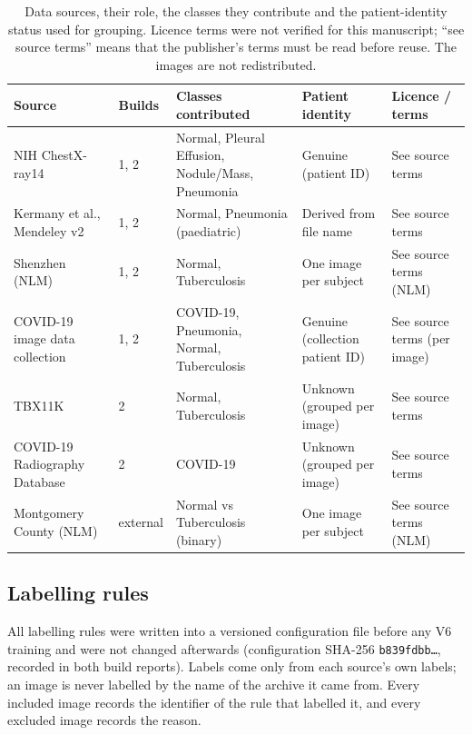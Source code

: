 \begin{table}[t]
\centering
\caption{Data sources, their role, the classes they contribute and the patient-identity status used for grouping. Licence terms were not verified for this manuscript; ``see source terms'' means that the publisher's terms must be read before reuse. The images are not redistributed.}
\label{tab:sources}
\small
\begin{tabular}{@{}p{3.0cm}p{1.5cm}p{3.6cm}p{2.4cm}p{3.2cm}@{}}
\toprule
Source & Builds & Classes contributed & Patient identity & Licence / terms \\
\midrule
NIH ChestX-ray14~\cite{wang2017chestxray8} & 1, 2 & Normal, Pleural Effusion, Nodule/Mass, Pneumonia & Genuine (patient ID) & See source terms \\
Kermany et al., Mendeley v2~\cite{kermany2018identifying} & 1, 2 & Normal, Pneumonia (paediatric) & Derived from file name & See source terms \\
Shenzhen (NLM)~\cite{jaeger2014two,candemir2014lung} & 1, 2 & Normal, Tuberculosis & One image per subject & See source terms (NLM) \\
COVID-19 image data collection~\cite{cohen2020covid} & 1, 2 & COVID-19, Pneumonia, Normal, Tuberculosis & Genuine (collection patient ID) & See source terms (per image) \\
TBX11K~\cite{liu2020rethinking} & 2 & Normal, Tuberculosis & Unknown (grouped per image) & See source terms \\
COVID-19 Radiography Database~\cite{chowdhury2020can,rahman2021exploring} & 2 & COVID-19 & Unknown (grouped per image) & See source terms \\
Montgomery County (NLM)~\cite{jaeger2014two,candemir2014lung} & external & Normal vs Tuberculosis (binary) & One image per subject & See source terms (NLM) \\
\bottomrule
\end{tabular}
\end{table}

\subsection{Labelling rules}
\label{sec:labels}
All labelling rules were written into a versioned configuration file before any V6 training and were not changed afterwards (configuration SHA-256 \texttt{b839fdbb\ldots}, recorded in both build reports). Labels come only from each source's own labels; an image is never labelled by the name of the archive it came from. Every included image records the identifier of the rule that labelled it, and every excluded image records the reason.

